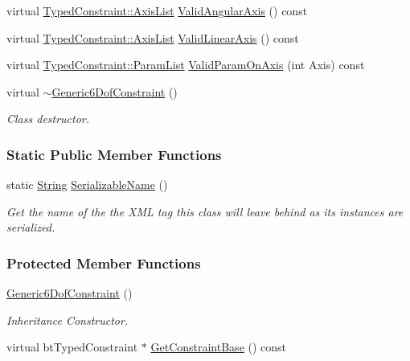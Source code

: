 \begin{DoxyCompactItemize}
virtual \hyperlink{classphys_1_1TypedConstraint_a26261a4055e84e104c58d84eea5667c2}{TypedConstraint::AxisList} \hyperlink{classphys_1_1Generic6DofConstraint_a08d49caf73c49a4a196ed0cd2eca6a8e}{ValidAngularAxis} () const 
\item 
virtual \hyperlink{classphys_1_1TypedConstraint_a26261a4055e84e104c58d84eea5667c2}{TypedConstraint::AxisList} \hyperlink{classphys_1_1Generic6DofConstraint_a2148eeda4ddfa9dd14f3f16ff1799a13}{ValidLinearAxis} () const 
\item 
virtual \hyperlink{classphys_1_1TypedConstraint_a4c2dcea3fbb764e454840329126d034e}{TypedConstraint::ParamList} \hyperlink{classphys_1_1Generic6DofConstraint_a937a090c9520a64bc72b85cb95c853dc}{ValidParamOnAxis} (int Axis) const 
\item 
\hypertarget{classphys_1_1Generic6DofConstraint_af5f9c4c27bdc4437ae49fc5e9c99ac3c}{
virtual \hyperlink{classphys_1_1Generic6DofConstraint_af5f9c4c27bdc4437ae49fc5e9c99ac3c}{$\sim$Generic6DofConstraint} ()}
\label{classphys_1_1Generic6DofConstraint_af5f9c4c27bdc4437ae49fc5e9c99ac3c}

\begin{DoxyCompactList}\small\item\em Class destructor. \item\end{DoxyCompactList}\end{DoxyCompactItemize}
\subsubsection*{Static Public Member Functions}
\begin{DoxyCompactItemize}
\item 
static \hyperlink{namespacephys_aa03900411993de7fbfec4789bc1d392e}{String} \hyperlink{classphys_1_1Generic6DofConstraint_a7cc944e9655af095b4c24340d92a2b3c}{SerializableName} ()
\begin{DoxyCompactList}\small\item\em Get the name of the the XML tag this class will leave behind as its instances are serialized. \item\end{DoxyCompactList}\end{DoxyCompactItemize}
\subsubsection*{Protected Member Functions}
\begin{DoxyCompactItemize}
\item 
\hyperlink{classphys_1_1Generic6DofConstraint_ab897b1d7f04073cae60cf1d2615d04b4}{Generic6DofConstraint} ()
\begin{DoxyCompactList}\small\item\em Inheritance Constructor. \item\end{DoxyCompactList}\item 
virtual btTypedConstraint $\ast$ \hyperlink{classphys_1_1Generic6DofConstraint_ac400e37ab564cfe82efb74caabb0a7cd}{GetConstraintBase} () const 
\end{DoxyCompactItemize}
